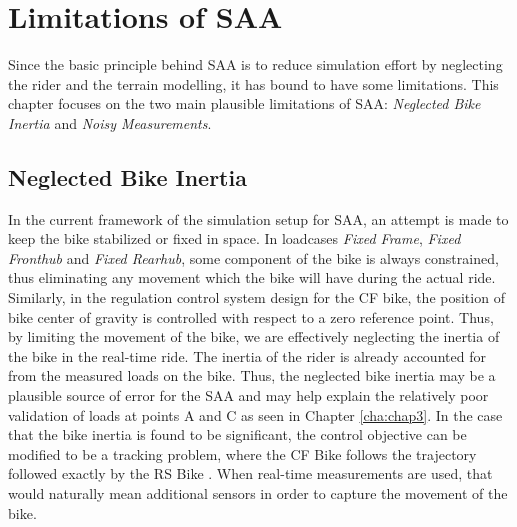 \changefontsizes{20pt}
\chapter{Limitations of SAA}
\label{cha:chap4}
\changefontsizes{12pt}
Since the basic principle behind SAA is to reduce simulation effort by neglecting the rider and the terrain modelling, it has bound to have some limitations. This chapter focuses on the two main plausible limitations of SAA: \emph{Neglected Bike Inertia} and \emph{Noisy Measurements}.

\section{Neglected Bike Inertia}
\label{sec:chap4sec1}
In the current framework of the simulation setup for SAA, an attempt is made to keep the bike stabilized or fixed in space. In loadcases \emph{Fixed Frame}, \emph{Fixed Fronthub} and \emph{Fixed Rearhub}, some component of the bike is always constrained, thus eliminating any movement which the bike will have during the actual ride. Similarly, in the regulation control system design for the CF bike, the position of bike center of gravity is controlled with respect to a zero reference point. Thus, by limiting the movement of the bike, we are effectively neglecting the inertia of the bike in the real-time ride. The inertia of the rider is already accounted for from the measured loads on the bike. Thus, the neglected bike inertia may be a plausible source of error for the SAA and may help explain the relatively poor validation of loads at points A and C as seen in Chapter \ref{cha:chap3}. In the case that the bike inertia is found to be significant, the control objective can be modified to be a tracking problem, where the CF Bike follows the trajectory followed exactly by the RS Bike \cite{BBJ21,JBB20}. When real-time measurements are used, that would naturally mean additional sensors in order to capture the movement of the bike.

